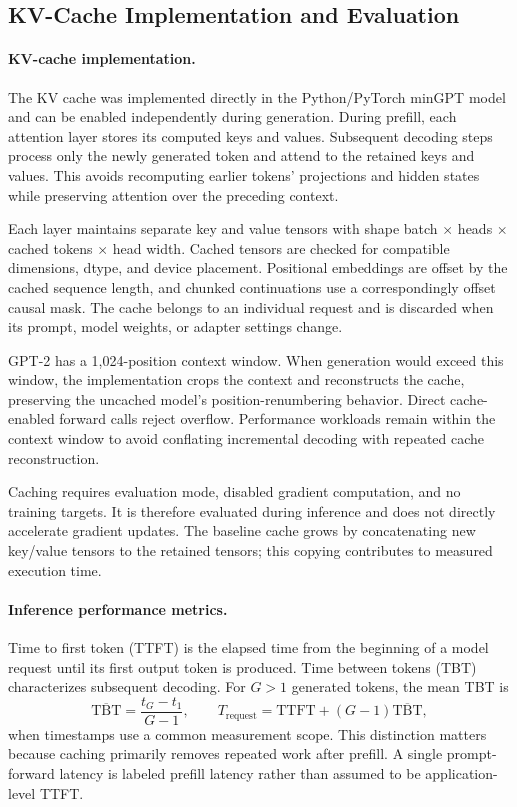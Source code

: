 \subsection{KV-Cache Implementation and Evaluation}
\label{sec:method_cache}

\paragraph{KV-cache implementation.}
The KV cache was implemented directly in the Python/PyTorch minGPT model and can be enabled independently during generation. During prefill, each attention layer stores its computed keys and values. Subsequent decoding steps process only the newly generated token and attend to the retained keys and values. This avoids recomputing earlier tokens' projections and hidden states while preserving attention over the preceding context.

Each layer maintains separate key and value tensors with shape batch $\times$ heads $\times$ cached tokens $\times$ head width. Cached tensors are checked for compatible dimensions, dtype, and device placement. Positional embeddings are offset by the cached sequence length, and chunked continuations use a correspondingly offset causal mask. The cache belongs to an individual request and is discarded when its prompt, model weights, or adapter settings change.

GPT-2 has a 1,024-position context window. When generation would exceed this window, the implementation crops the context and reconstructs the cache, preserving the uncached model's position-renumbering behavior. Direct cache-enabled forward calls reject overflow. Performance workloads remain within the context window to avoid conflating incremental decoding with repeated cache reconstruction.

Caching requires evaluation mode, disabled gradient computation, and no training targets. It is therefore evaluated during inference and does not directly accelerate gradient updates. The baseline cache grows by concatenating new key/value tensors to the retained tensors; this copying contributes to measured execution time.

\paragraph{Inference performance metrics.}
Time to first token (TTFT) is the elapsed time from the beginning of a model request until its first output token is produced. Time between tokens (TBT) characterizes subsequent decoding. For $G>1$ generated tokens, the mean TBT is
\begin{equation}
 \overline{\mathrm{TBT}}=
 \frac{t_G-t_1}{G-1},\qquad
 T_{\mathrm{request}}=\mathrm{TTFT}+(G-1)\overline{\mathrm{TBT}},
\end{equation}
when timestamps use a common measurement scope. This distinction matters because caching primarily removes repeated work after prefill. A single prompt-forward latency is labeled prefill latency rather than assumed to be application-level TTFT.

